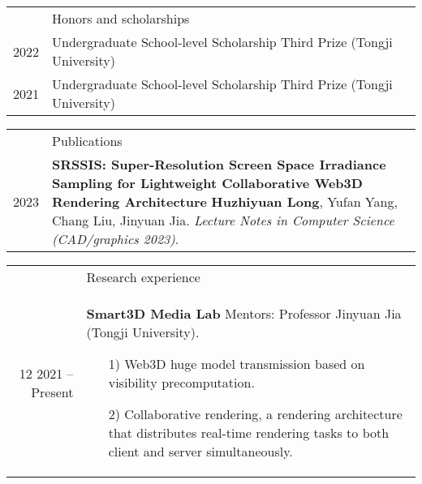 \documentclass[letterpaper, 11pt]{article}
\newcommand{\headingfont}{\Large\color{OliveGreen}}
\newenvironment{SectionTable}[1]{
	\renewcommand*{\arraystretch}{1.7}
	\setlength{\tabcolsep}{10pt}
	\begin{longtable}{Rp{5.2in}} & #1 \\}
{\end{longtable}\vspace{-.3cm}}
\newenvironment{SectionTableSingleSpace}[1]{
	\renewcommand*{\arraystretch}{1.2}
	\setlength{\tabcolsep}{10pt}
	\begin{longtable}{Rp{5.2in}} & #1 \\[0.6em]}
{\end{longtable}\vspace{-.3cm}}
\begin{document}

\begin{SectionTableSingleSpace}{\headingfont Honors and scholarships}


    2022 &
    Undergraduate School-level Scholarship Third Prize (Tongji University) \\

    2021 &
    Undergraduate School-level Scholarship Third Prize (Tongji University)
\end{SectionTableSingleSpace}


\begin{SectionTable}{\headingfont Publications}
    2023 &
    \textbf{SRSSIS: Super-Resolution Screen Space Irradiance Sampling for Lightweight Collaborative Web3D Rendering Architecture} \newline
    \textbf{Huzhiyuan Long}, Yufan Yang, Chang Liu, Jinyuan Jia. \newline
    \textit{Lecture Notes in Computer Science (CAD/graphics 2023)}. \\


\end{SectionTable}


\begin{SectionTable}{\headingfont Research experience}
    12 2021 -- Present &
    \textbf{Smart3D Media Lab} \newline
    Mentors: Professor Jinyuan Jia (Tongji University). \newline
    \begin{itemize}
        \item [1)]
              Web3D huge model transmission based on visibility precomputation.
        \item [2)]
              Collaborative rendering, a rendering architecture that distributes real-time rendering tasks to both client and server simultaneously.
    \end{itemize} \\

\end{SectionTable}
\end{document}
